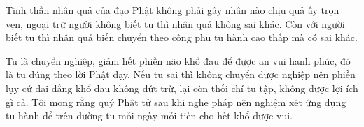 \documentclass[
  12pt,
  oneside]{book}
\begin{document}
Tinh thần nhân quả của đạo Phật không phải gây nhân nào chịu quả ấy trọn vẹn, ngoại trừ người không biết tu thì nhân quả không sai khác. Còn với người biết tu thì nhân quả biến chuyển theo công phu tu hành cao thấp mà có sai khác.

Tu là chuyển nghiệp, giảm hết phiền não khổ đau để được an vui hạnh phúc, đó là tu đúng theo lời Phật dạy. Nếu tu sai thì không chuyển được nghiệp nên phiền lụy cứ dai dẳng khổ đau không dứt trừ, lại còn thối chí tu tập, không được lợi ích gì cả. Tôi mong rằng quý Phật tử sau khi nghe pháp nên nghiệm xét ứng dụng tu hành để trên đường tu mỗi ngày mỗi tiến cho hết khổ được vui.
\end{document}
